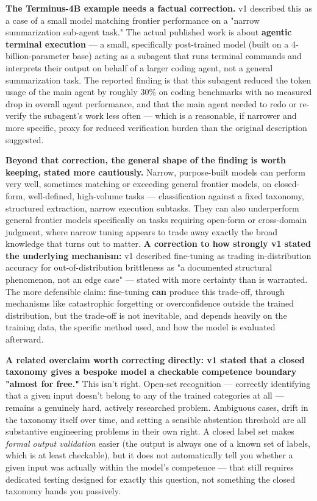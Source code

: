 \textbf{The Terminus-4B example needs a factual correction.} v1 described this as a case of a small model matching frontier performance on a "narrow summarization sub-agent task." The actual published work is about \textbf{agentic terminal execution} --- a small, specifically post-trained model (built on a 4-billion-parameter base) acting as a subagent that runs terminal commands and interprets their output on behalf of a larger coding agent, not a general summarization task. The reported finding is that this subagent reduced the token usage of the main agent by roughly 30\% on coding benchmarks with no measured drop in overall agent performance, and that the main agent needed to redo or re-verify the subagent's work less often --- which is a reasonable, if narrower and more specific, proxy for reduced verification burden than the original description suggested.

\textbf{Beyond that correction, the general shape of the finding is worth keeping, stated more cautiously.} Narrow, purpose-built models can perform very well, sometimes matching or exceeding general frontier models, on closed-form, well-defined, high-volume tasks --- classification against a fixed taxonomy, structured extraction, narrow execution subtasks. They can also underperform general frontier models specifically on tasks requiring open-form or cross-domain judgment, where narrow tuning appears to trade away exactly the broad knowledge that turns out to matter. \textbf{A correction to how strongly v1 stated the underlying mechanism:} v1 described fine-tuning as trading in-distribution accuracy for out-of-distribution brittleness as "a documented structural phenomenon, not an edge case" --- stated with more certainty than is warranted. The more defensible claim: fine-tuning \textbf{can} produce this trade-off, through mechanisms like catastrophic forgetting or overconfidence outside the trained distribution, but the trade-off is not inevitable, and depends heavily on the training data, the specific method used, and how the model is evaluated afterward.

\textbf{A related overclaim worth correcting directly: v1 stated that a closed taxonomy gives a bespoke model a checkable competence boundary "almost for free."} This isn't right. Open-set recognition --- correctly identifying that a given input doesn't belong to any of the trained categories at all --- remains a genuinely hard, actively researched problem. Ambiguous cases, drift in the taxonomy itself over time, and setting a sensible abstention threshold are all substantive engineering problems in their own right. A closed label set makes \emph{formal output validation} easier (the output is always one of a known set of labels, which is at least checkable), but it does not automatically tell you whether a given input was actually within the model's competence --- that still requires dedicated testing designed for exactly this question, not something the closed taxonomy hands you passively.

